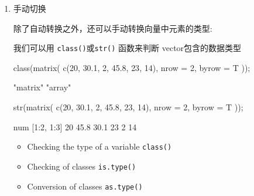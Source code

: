 \documentclass[
]{article}
\newenvironment{Shaded}{}{}
\newcommand{\AttributeTok}[1]{\textcolor[rgb]{0.49,0.56,0.16}{#1}}
\newcommand{\DecValTok}[1]{\textcolor[rgb]{0.25,0.63,0.44}{#1}}
\newcommand{\FloatTok}[1]{\textcolor[rgb]{0.25,0.63,0.44}{#1}}
\newcommand{\FunctionTok}[1]{\textcolor[rgb]{0.02,0.16,0.49}{#1}}
\newcommand{\NormalTok}[1]{#1}
\begin{document}
\begin{enumerate}
\def\labelenumi{\arabic{enumi}.}
\item
  手动切换

  除了自动转换之外，还可以手动转换向量中元素的类型:

  我们可以用 \texttt{class()}或\texttt{str()} 函数来判断
  vector包含的数据类型

\begin{Shaded}
\begin{Highlighting}[]
\FunctionTok{class}\NormalTok{(}\FunctionTok{matrix}\NormalTok{( }\FunctionTok{c}\NormalTok{(}\DecValTok{20}\NormalTok{, }\FloatTok{30.1}\NormalTok{, }\DecValTok{2}\NormalTok{, }\FloatTok{45.8}\NormalTok{, }\DecValTok{23}\NormalTok{, }\DecValTok{14}\NormalTok{), }
              \AttributeTok{nrow =} \DecValTok{2}\NormalTok{, }\AttributeTok{byrow =}\NormalTok{ T ));}
\end{Highlighting}
\end{Shaded}

\begin{Shaded}
\begin{Highlighting}[]
\NormalTok{[1] "matrix" "array" }
\end{Highlighting}
\end{Shaded}

\begin{Shaded}
\begin{Highlighting}[]
\FunctionTok{str}\NormalTok{(}\FunctionTok{matrix}\NormalTok{( }\FunctionTok{c}\NormalTok{(}\DecValTok{20}\NormalTok{, }\FloatTok{30.1}\NormalTok{, }\DecValTok{2}\NormalTok{, }\FloatTok{45.8}\NormalTok{, }\DecValTok{23}\NormalTok{, }\DecValTok{14}\NormalTok{), }
            \AttributeTok{nrow =} \DecValTok{2}\NormalTok{, }\AttributeTok{byrow =}\NormalTok{ T ));}
\end{Highlighting}
\end{Shaded}

\begin{Shaded}
\begin{Highlighting}[]
\NormalTok{ num [1:2, 1:3] 20 45.8 30.1 23 2 14}
\end{Highlighting}
\end{Shaded}

  \begin{itemize}
  \item
    Checking the type of a variable \texttt{class()}
  \item
    Checking of classes \texttt{is.type()}
  \item
    Conversion of classes \texttt{as.type()}
  \end{itemize}
\end{enumerate}
\end{document}
